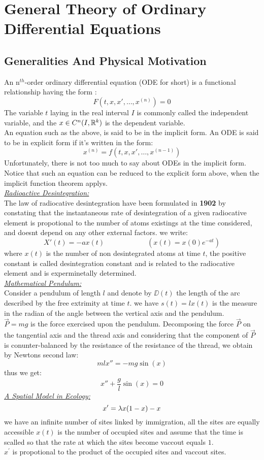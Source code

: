\chapter{General Theory of Ordinary Differential Equations}
\section{Generalities And Physical Motivation}

An n$^{th} $-order ordinary differential equation (ODE for short) 
is a functional relationship having the form :
\[
F(t, x, x', \hdots , x^{(n)})  = 0
\]
The variable $t $ laying in the real interval $ I $ is commonly called the 
independent variable, and the $x \in C^{n}(I, \mathbb{R} ^{k} )$ is the dependent 
variable. \\
An equation such as the above, is 
said to be in the implicit form. An ODE
is said to be in explicit form if 
it's written in the form: 
\[
x^{(n) } = 
f(t, x, x', \hdots , x^{(n-1) }) 
\]
Unfortunately, there is not too much to say about 
ODEs in the implicit form. Notice that such an equation 
can be reduced to the explicit form above, when the implicit function 
theorem applys.\\
\underline{\emph{Radioactive Desintegration:}} \\ The law of radiocative desintegration
have been formulated in \textbf{1902} by constating that the instantaneous 
rate of desintegration of a given radiocative element is propotional to the
number of atoms existings at the time considered, and doesnt 
depend on any other external factors. we write: 
\[
  X'(t)  = - a x(t)  \quad \quad \quad \quad \quad \quad 
  ( x(t) = x(0) e^{-at}   ) 
\]
where $x(t)$ is the number of non desintegrated atoms at time $t$, 
the positive constant is called desintegration constant and is related to the 
radiocative element and is experminetally determined.\\
\underline{\emph{Mathematical Pendulum:}} \\ Consider a pendulum of length $l $ and denote by $\DD  (t)  $ the length of the 
arc described by the free extrimity at time $t$. we have $s(t) = l x(t)   $ is
the measure in the radian of the angle between the vertical axis and the pendulum. \\
$\vec{P} = mg  $  is the force exercised upon the pendulum. Decomposing the force $\vec{P}  $ 
on the tangential axis and the thread axis and considering that the component of $\vec{P}  $ is
conunter-balanced by the resistance of the resistance of the thread, we obtain by
Newtons second law:
\[
m l x'' = -mg \sin{(x) }
\]
thus we get: 
\[
x'' + \frac{g}{l} \sin{ (x) } = 0
\]
\underline{\emph{A Spatial Model in Ecology:}} 
\[
x' = \lambda x (1 - x)  - x
\]
we have an infinite number of sites linked by immigration, all the sites are equally accessible
$x(t)$ is the number of occupied sites and assume that the time is scalled 
so that the rate at which the sites become vaccout equals $1$. \\
$x^{'} $ is propotional to the product of the occupied sites and vaccout sites.

